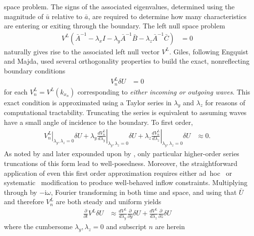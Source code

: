 \documentclass[letterpaper,11pt,nointlimits,reqno,draft]{amsart}
\newcommand{\ii}{\ensuremath{\mathrm{i}}}
\begin{document}
space problem.  The signs of the associated eigenvalues, determined using the
magnitude of $\bar{u}$ relative to $\bar{a}$, are required to determine how
many characteristics are entering or exiting through the boundary.  The left
null space problem
\begin{align}
\label{eq:dimeulereigenprob}
  V^{L}
  \left(   \bar{A}^{-1}
         - \lambda_x I
         - \lambda_y \bar{A}^{-1} \bar{B}
         - \lambda_z \bar{A}^{-1} \bar{C}
  \right) &= 0
\end{align}
naturally gives rise to the associated left null vector $V^L$.  Giles,
following Engquist and Majda, used several orthogonality properties to build
the exact, nonreflecting boundary conditions
\begin{align}
\label{eq:dimeulerexact}
  V_n^L \delta{}U &= 0
\end{align}
for each $V_n^L = V^L\!\left(k_{x_n}\right)$ corresponding to \textit{either
incoming or outgoing waves}.  This exact condition is approximated using a
Taylor series in $\lambda_y$ and $\lambda_z$ for reasons of computational
tractability.  Truncating the series is equivalent to assuming waves have a
small angle of incidence to the boundary.  To first order,
\begin{align}
  \left.V_n^L\right|_{\lambda_y,\lambda_z=0}
  \delta{}U
  +
  \lambda_y
  \left.\frac{dV_n^L}{d\lambda_y}\right|_{\lambda_y,\lambda_z=0}
  \delta{}U
  +
  \lambda_z
  \left.\frac{dV_n^L}{d\lambda_z}\right|_{\lambda_y,\lambda_z=0}
  \delta{}U
  &\approx 0
  .
\end{align}
As noted by \citet{Engquist1977Absorbing} and later expounded upon by
\citet{Trefethen1986Wellposedness}, only particular higher-order series
truncations of this form lead to well-posedness.  Moreover, the straightforward
application of even this first order approximation requires either
ad~hoc~\citep{Giles1988Nonreflecting,Medida2007} or
systematic~\citep{Rowley2000Discretely} modification to produce well-behaved
inflow constraints.  Multiplying through by $-\ii\omega$, Fourier transforming
in both time and space, and using that $\bar{U}$ and therefore $V_n^L$ are both
steady and uniform yields
\begin{align}
\label{eq:dimeulerapprox}
  \frac{\partial}{\partial{}t}
  V^L
  \delta{}U
  &\approx
  \frac{dV^L}{d\lambda_y}
  \frac{\partial}{\partial{}y}\delta{}U
  +
  \frac{dV^L}{d\lambda_z}
  \frac{\partial}{\partial{}z}\delta{}U
\end{align}
where the cumbersome $\lambda_y,\lambda_z=0$ and subscript $n$ are herein
\end{document}
